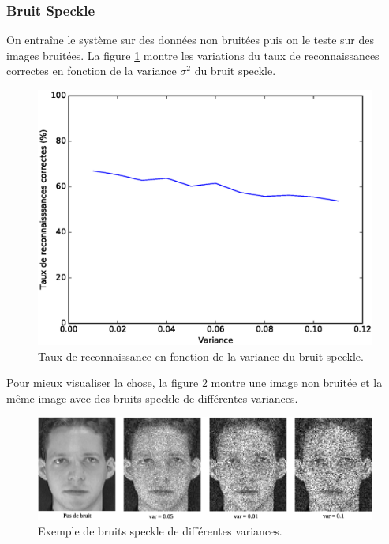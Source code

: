 \subsubsection{Bruit Speckle}
On entraîne le système sur des données non bruitées puis on le teste sur des images
bruitées. La figure \ref{fig:robustness:speckle:test} montre les variations du taux
de reconnaissances correctes en fonction de la variance $\sigma^2$ du bruit speckle.
\begin{figure}[H]
    \centering
    \includegraphics[scale=0.5]{images/robustesse_speckle_test}
    \caption{Taux de reconnaissance en fonction de la variance du bruit speckle.}
    \label{fig:robustness:speckle:test}
\end{figure}
Pour mieux visualiser la chose, la figure \ref{fig:robustness:speckle:exemple} montre
une image non bruitée et la même image avec des bruits speckle de différentes variances.
\begin{figure}[H]
    \centering
    \includegraphics[scale=0.44]{images/robustness_speckle_exemple}
    \caption{Exemple de bruits speckle de différentes variances.}
    \label{fig:robustness:speckle:exemple}
\end{figure}

